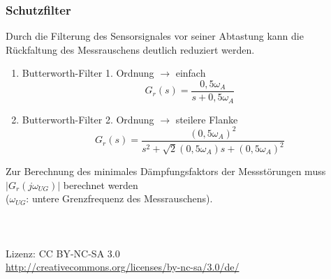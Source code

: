 \documentclass[a4paper,twocolumn,10pt]{article}
\begin{document}
\subsubsection{Schutzfilter}
Durch die Filterung des Sensorsignales vor seiner Abtastung kann die Rückfaltung des Messrauschens deutlich reduziert werden.
\begin{enumerate}[label=$\bullet$]
\item Butterworth-Filter 1. Ordnung $\rightarrow$ einfach
\begin{equation*}
G_r(s)=\frac{0,5\omega_A}{s+0,5\omega_A}
\end{equation*}
\item Butterworth-Filter 2. Ordnung $\rightarrow$ steilere Flanke
\begin{equation*}
G_r(s)=\frac{(0,5\omega_A)^2}{s^2+\sqrt{2}(0,5\omega_A)s+(0,5\omega_A)^2}
\end{equation*}
\end{enumerate}
Zur Berechnung des minimales Dämpfungsfaktors der Messstörungen muss $|G_r(j\omega_{UG})|$ berechnet werden\\
($\omega_{UG}$: untere Grenzfrequenz des Messrauschens). 
\\\\\\\\
Lizenz: CC BY-NC-SA 3.0\\
\url{http://creativecommons.org/licenses/by-nc-sa/3.0/de/}
\end{document}
